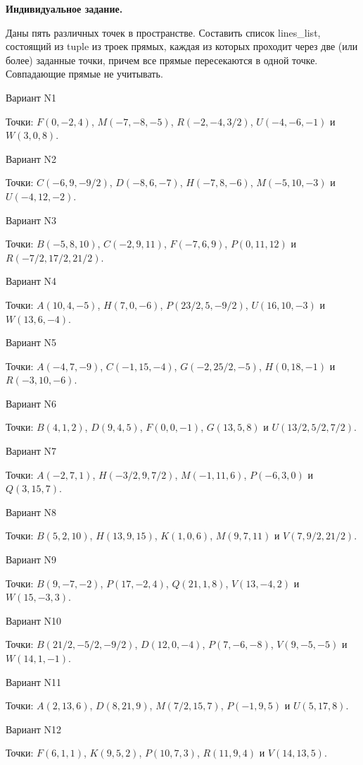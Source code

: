 \documentclass[11pt]{report}
\begin{document}
\pagestyle{empty}

{\bf Индивидуальное задание.}

  Даны пять различных точек в пространстве. Составить список lines\_list, состоящий из  tuple из троек прямых, каждая из которых проходит через две (или более) 
заданные точки, причем все прямые пересекаются в одной точке. Совпадающие прямые не учитывать.

Вариант N1

Точки: $F(0, -2, 4)$, $M(-7, -8, -5)$, $R(-2, -4, 3/2)$, $U(-4, -6, -1)$ и $W(3, 0, 8)$.

Вариант N2

Точки: $C(-6, 9, -9/2)$, $D(-8, 6, -7)$, $H(-7, 8, -6)$, $M(-5, 10, -3)$ и $U(-4, 12, -2)$.

Вариант N3

Точки: $B(-5, 8, 10)$, $C(-2, 9, 11)$, $F(-7, 6, 9)$, $P(0, 11, 12)$ и $R(-7/2, 17/2, 21/2)$.

Вариант N4

Точки: $A(10, 4, -5)$, $H(7, 0, -6)$, $P(23/2, 5, -9/2)$, $U(16, 10, -3)$ и $W(13, 6, -4)$.

Вариант N5

Точки: $A(-4, 7, -9)$, $C(-1, 15, -4)$, $G(-2, 25/2, -5)$, $H(0, 18, -1)$ и $R(-3, 10, -6)$.

Вариант N6

Точки: $B(4, 1, 2)$, $D(9, 4, 5)$, $F(0, 0, -1)$, $G(13, 5, 8)$ и $U(13/2, 5/2, 7/2)$.

Вариант N7

Точки: $A(-2, 7, 1)$, $H(-3/2, 9, 7/2)$, $M(-1, 11, 6)$, $P(-6, 3, 0)$ и $Q(3, 15, 7)$.

Вариант N8

Точки: $B(5, 2, 10)$, $H(13, 9, 15)$, $K(1, 0, 6)$, $M(9, 7, 11)$ и $V(7, 9/2, 21/2)$.

Вариант N9

Точки: $B(9, -7, -2)$, $P(17, -2, 4)$, $Q(21, 1, 8)$, $V(13, -4, 2)$ и $W(15, -3, 3)$.

Вариант N10

Точки: $B(21/2, -5/2, -9/2)$, $D(12, 0, -4)$, $P(7, -6, -8)$, $V(9, -5, -5)$ и $W(14, 1, -1)$.

Вариант N11

Точки: $A(2, 13, 6)$, $D(8, 21, 9)$, $M(7/2, 15, 7)$, $P(-1, 9, 5)$ и $U(5, 17, 8)$.

Вариант N12

Точки: $F(6, 1, 1)$, $K(9, 5, 2)$, $P(10, 7, 3)$, $R(11, 9, 4)$ и $V(14, 13, 5)$.
\end{document}
